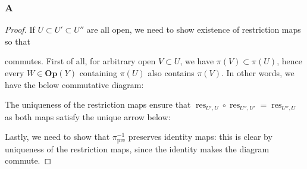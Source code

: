 \documentclass{article}
\newcommand{\id}{\mathrm{id}}
\newcommand{\fG}{\mathscr{G}}
\newcommand{\Op}{\mathbf{Op}} %
\DeclareMathOperator{\res}{\mathrm{res}}
\DeclareMathOperator{\pre}{\mathrm{pre}}
\DeclareMathOperator{\colim}{\mathrm{colim}}
\begin{document}
\subsubsection{A}\label{2.7.A}
\begin{proof}
    If $U\subset U'\subset U''$ are all open, we need to show existence of restriction maps so that
    \begin{center}
    \end{center}
    commutes. First of all, for arbitrary open $V\subset U$, we have $\pi(V)\subset \pi(U)$, hence every $W\in \Op(Y)$ containing $\pi(U)$ also contains $\pi(V)$. In other words, we have the below commutative diagram:
    \begin{center}
    \end{center}
    The uniqueness of the restriction maps ensure that $\res_{U',U} \circ \res_{U'',U'} = \res_{U'',U}$ as both maps satisfy the unique arrow below:
    \begin{center}
    \end{center}
    Lastly, we need to show that $\pi^{-1}_{\pre}$ preserves identity maps: this is clear by uniqueness of the restriction maps, since the identity makes the diagram commute.


\end{proof}
\end{document}
